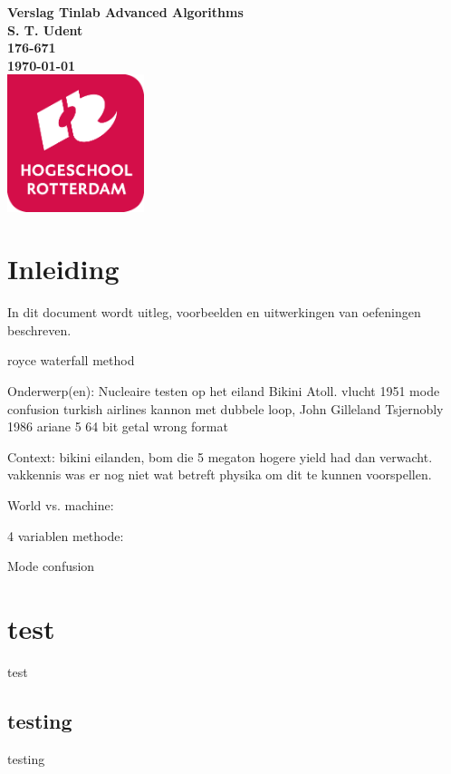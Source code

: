 \documentclass{article}
\begin{document}
\sffamily



\begin{titlepage}
  \centering
    \vfill
    {\bfseries\Huge
      Verslag Tinlab Advanced Algorithms \\
        \vskip2cm
      }
      {\bfseries\Large
        S. T. Udent\\
      }
      {
        \bfseries\normalsize
        176-671\\
        \vskip1cm
        \today\\
    }    
    \vfill
    \includegraphics[width=4cm]{logohr.png} %
    \vfill
    \vfill
\end{titlepage}
\newpage
\tableofcontents

\newpage
\section{Inleiding}
In dit document wordt uitleg, voorbeelden en uitwerkingen van oefeningen beschreven. 


royce waterfall method



Onderwerp(en): 
Nucleaire testen op het eiland Bikini Atoll.
vlucht 1951 mode confusion turkish airlines
kannon met dubbele loop, John Gilleland
Tsjernobly 1986
ariane 5 64 bit getal wrong format

Context:
bikini eilanden, bom die 5 megaton hogere yield had dan verwacht. vakkennis was er nog niet wat betreft physika om dit te kunnen voorspellen.


World vs. machine:



4 variablen methode:


Mode confusion 




\section{test}
test
\subsection{testing}
testing
\end{document}
